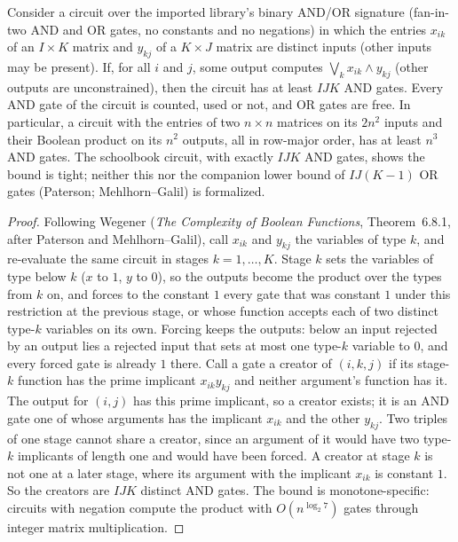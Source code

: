 \begin{theorem}
  \label{thm:lowerbounds-monotone-matrix}
  \leanok
  Consider a circuit over the imported library's binary AND/OR signature
  (fan-in-two AND and OR gates, no constants and no negations) in which the
  entries $x_{ik}$ of an $I \times K$ matrix and $y_{kj}$ of a $K \times J$
  matrix are distinct inputs (other inputs may be present). If, for all $i$
  and $j$, some output computes $\bigvee_k x_{ik} \wedge y_{kj}$ (other outputs
  are unconstrained), then the circuit has at least $IJK$ AND gates. Every AND
  gate of the circuit is counted, used or not, and OR gates are free. In
  particular, a circuit with the entries of two $n \times n$ matrices on its
  $2n^2$ inputs and their Boolean product on its $n^2$ outputs, all in
  row-major order, has at least $n^3$ AND gates. The schoolbook circuit, with
  exactly $IJK$ AND gates, shows the bound is tight; neither this nor the
  companion lower bound of $IJ(K - 1)$ OR gates (Paterson; Mehlhorn--Galil)
  is formalized.
\end{theorem}
\begin{proof}
  \leanok
  Following Wegener (\emph{The Complexity of Boolean Functions}, Theorem~6.8.1,
  after Paterson and Mehlhorn--Galil), call $x_{ik}$ and $y_{kj}$ the variables
  of type $k$, and re-evaluate the same circuit in stages $k = 1, \dots, K$.
  Stage $k$ sets the variables of type below $k$ ($x$ to $1$, $y$ to $0$), so
  the outputs become the product over the types from $k$ on, and forces to the
  constant $1$ every gate that was constant $1$ under this restriction at the
  previous stage, or whose function accepts each of two distinct type-$k$
  variables on its own. Forcing keeps the outputs: below an input rejected by
  an output lies a rejected input that sets at most one type-$k$ variable to
  $0$, and every forced gate is already $1$ there. Call a gate a creator of $(i, k, j)$
  if its stage-$k$ function has the prime implicant $x_{ik} y_{kj}$ and neither
  argument's function has it. The output for $(i, j)$ has this prime implicant,
  so a creator exists; it is an AND gate one of whose arguments has the
  implicant $x_{ik}$ and the other $y_{kj}$. Two triples of one stage cannot
  share a creator, since an argument of it would have two type-$k$ implicants
  of length one and would have been forced. A creator at stage $k$ is not one
  at a later stage, where its argument with the implicant $x_{ik}$ is
  constant $1$. So the creators are $IJK$ distinct AND gates. The bound is
  monotone-specific: circuits with negation compute the product with
  $O(n^{\log_2 7})$ gates through integer matrix multiplication.
\end{proof}

